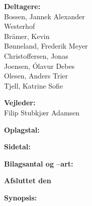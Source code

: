 \begin{titlepage}
\begin{minipage}{0.4\textwidth}
\begin{description}
    \item {\bf Deltagere:}\\
    Bossen, Jannek Alexander \\Westerhof\\
    Brämer, Kevin\\
    Bønneland, Frederik Meyer\\
    Christoffersen, Jonas\\
    Joensen, Ólavur Debes\\
    Olesen, Anders Trier\\
    Tjell, Katrine Sofie\\
    
    \item {\bf Vejleder:}\\
    Filip Stubkjær Adamsen\\
    
    \item {\bf Oplagstal:} \rprints
    \item {\bf Sidetal:} \pageref{LastPage} %
    \item {\bf Bilagsantal og --art:} \rappendices
    \item {\bf Afsluttet den} \rdeadline
    \end{description}
  \end{minipage}
  \hfill
  \begin{minipage}{0.4\textwidth}
    {\bf Synopsis:}\bigskip \\
    {\bigskip
    {\vfill{\small 
    \bigskip}}}
  \end{minipage}
  \newline\newline\newline
\end{titlepage}
